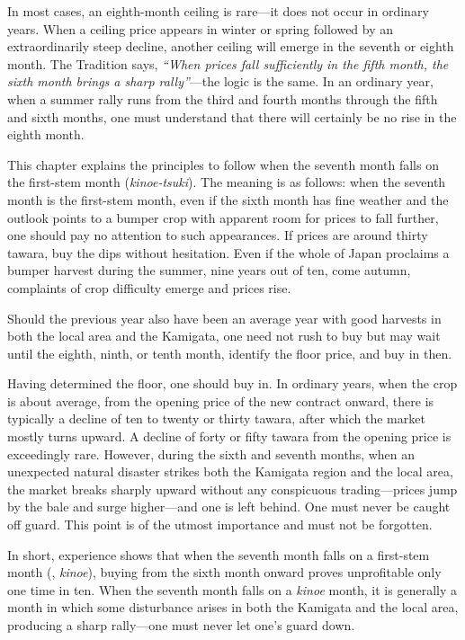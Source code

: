 \begin{sokyubox}
In most cases, an eighth-month ceiling is rare---it does not occur in
ordinary years. When a ceiling price appears in winter or spring followed
by an extraordinarily steep decline, another ceiling will emerge in the
seventh or eighth month. The Tradition says, \textit{``When prices fall
sufficiently in the fifth month, the sixth month brings a sharp
rally''}---the logic is the same. In an ordinary year, when a summer
rally runs from the third and fourth months through the fifth and sixth
months, one must understand that there will certainly be no rise in the
eighth month.
\end{sokyubox}

\commentary
This chapter explains the principles to follow when the seventh month
falls on the first-stem month (\textit{kinoe-tsuki}). The meaning is as
follows: when the seventh month is the first-stem month, even if the
sixth month has fine weather and the outlook points to a bumper crop with
apparent room for prices to fall further, one should pay no attention to
such appearances. If prices are around thirty tawara, buy the dips
without hesitation. Even if the whole of Japan proclaims a bumper
harvest during the summer, nine years out of ten, come autumn, complaints
of crop difficulty emerge and prices rise.

Should the previous year also have been an average year with good
harvests in both the local area and the Kamigata, one need not rush to
buy but may wait until the eighth, ninth, or tenth month, identify the
floor price, and buy in then.

Having determined the floor, one should buy in. In ordinary years, when
the crop is about average, from the opening price of the new contract
onward, there is typically a decline of ten to twenty or thirty tawara,
after which the market mostly turns upward. A decline of forty or fifty
tawara from the opening price is exceedingly rare. However, during the
sixth and seventh months, when an unexpected natural disaster strikes
both the Kamigata region and the local area, the market breaks sharply
upward without any conspicuous trading---prices jump by the bale and
surge higher---and one is left behind. One must never be caught off
guard. This point is of the utmost importance and must not be forgotten.

In short, experience shows that when the seventh month falls on a
first-stem month (, \textit{kinoe}), buying from the sixth month
onward proves unprofitable only one time in ten. When the seventh month
falls on a \textit{kinoe} month, it is generally a month in which some
disturbance arises in both the Kamigata and the local area, producing a
sharp rally---one must never let one's guard down.


